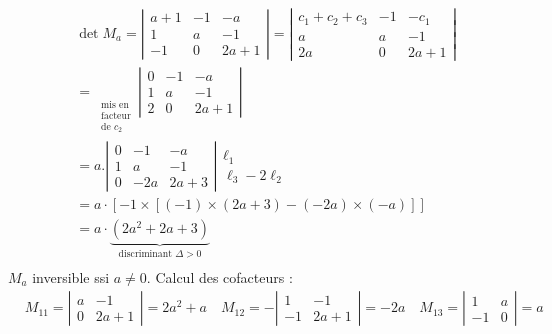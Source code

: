 {{$$
\begin{aligned}
	& \operatorname{det} M_a=\left|\begin{array}{ccc}
		a+1 & -1 & -a \\
		1 & a & -1 \\
		-1 & 0 & 2 a+1
	\end{array}\right|=\left|\begin{array}{ccc}
		c_1+c_2+c_3 & -1 & -c_1 \\
		a & a & -1 \\
		2 a & 0 & 2 a+1
	\end{array}\right| \\
	& =\underset{\substack{\text { mis en } \\
			\text { facteur } \\
			\text { de } c_2}}{ }\left|\begin{array}{ccc}
		0 & -1 & -a \\
		1 & a & -1 \\
		2 & 0 & 2 a+1
	\end{array}\right| \\
	& =a .\left|\begin{array}{ccc}
		0 & -1 & -a \\
		1 & a & -1 \\
		0 & -2 a & 2 a+3
	\end{array}\right| \begin{array}{c}
		\ell_1 \\
		\ell_3-2 \ell_2
	\end{array} \\
	& =a \cdot[-1 \times[(-1) \times(2 a+3)-(-2 a) \times(-a)]] \\
	& =a \cdot \underbrace{\left(2 a^2+2 a+3\right)}_{\text {discriminant } \Delta>0} \\
	&
\end{aligned}
$$
$M_a$ inversible ssi $a \neq 0$.
Calcul des cofacteurs :
$$
\begin{aligned}
	& M_{11}=\left|\begin{array}{cc}
		a & -1 \\
		0 & 2 a+1
	\end{array}\right|=2 a^2+a \quad M_{12}=-\left|\begin{array}{cc}
		1 & -1 \\
		-1 & 2 a+1
	\end{array}\right|=-2 a \quad M_{13}=\left|\begin{array}{cc}
		1 & a \\
		-1 & 0
	\end{array}\right|=a \\

\end{aligned}$$}}
